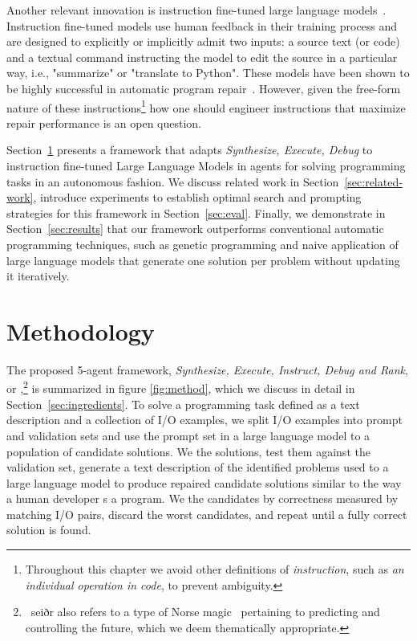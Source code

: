 Another relevant innovation is instruction fine-tuned large language models~\cite{ouyang2022:training}. Instruction fine-tuned models use human feedback in their training process and are designed to explicitly or implicitly admit two inputs: a source text (or code) and a textual command instructing the model to edit the source in a particular way, i.e., "summarize" or "translate to Python".
These models have been shown to be highly successful in automatic program repair~\cite{fanAutomatedRepairPrograms2023}. 
However, given the free-form nature of these instructions\footnote{Throughout this chapter we avoid other definitions of \emph{instruction}, such as \emph{an individual operation in code}, to prevent ambiguity.} how one should engineer instructions that maximize repair performance is an open question. 

Section~\ref{sec:seidr-methodology} presents a framework that adapts \emph{Synthesize, Execute, Debug} to instruction fine-tuned Large Language Models in agents for solving programming tasks in an autonomous fashion. 
We discuss related work in Section~\ref{sec:related-work}, introduce experiments to establish optimal search and prompting strategies for this framework in Section~\ref{sec:eval}. 
Finally, we demonstrate in Section~\ref{sec:results} that our framework outperforms conventional automatic programming techniques, such as genetic programming and naive application of large language models that generate one solution per problem without updating it iteratively. 

\newpage \section{Methodology}
\label{sec:seidr-methodology}
The proposed 5-agent framework, \emph{Synthesize, Execute, Instruct, Debug and Rank}, or \method{},\footnote{~seiðr also refers to a type of Norse magic~\cite{blain2002:nine} pertaining to predicting and controlling the future, which we deem thematically appropriate.} is summarized in figure \ref{fig:method}, which we discuss in detail in Section~\ref{sec:ingredients}.
To solve a programming task defined as a text description and a collection of I/O examples, we split I/O examples into prompt and validation sets and use the prompt set in a large language model to \synthesize{} a population of candidate solutions.
We \execute{} the solutions, test them against the validation set, generate a text description of the identified problems used to \instruct{} a large language model to produce repaired candidate solutions similar to the way a human developer \debug{}s a program.
We \rank{} the candidates
by correctness measured by matching I/O pairs, discard the worst candidates, and repeat until a fully correct solution is found.

